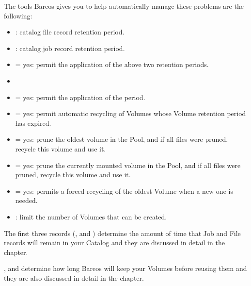 The tools Bareos gives you to help automatically manage these problems are the
following:

\begin{itemize}
\item {}: catalog file record retention period.
\item {}: catalog job record retention period.
\item {} = yes: permit the application of the above two retention periods.
\item {}
\item {} = yes: permit the application of the  period.
\item {} = yes: permit automatic recycling of Volumes whose Volume retention period has
   expired.
\item {} = yes: prune the oldest volume in the Pool, and if all
   files  were pruned, recycle this volume and use it.
\item {} = yes: prune the currently mounted volume in the
   Pool, and if all files  were pruned, recycle this volume and use it.
\item {} = yes: permits a forced recycling of the oldest Volume when a new one
   is  needed.\\
\item {}: limit the number of Volumes that can be created.
\end{itemize}

The first three records
(,  and )
determine the amount of time that Job and File records will remain in your
Catalog and they are discussed in detail in the
 chapter.

,  and 
determine how long Bareos will keep
your Volumes before reusing them and they are also discussed in detail in the
 chapter.

